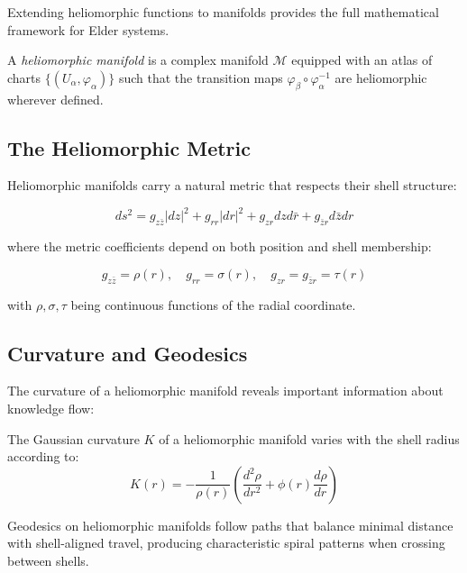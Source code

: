 Extending heliomorphic functions to manifolds provides the full mathematical framework for Elder systems.

\begin{definition}
A \textit{heliomorphic manifold} is a complex manifold $\mathcal{M}$ equipped with an atlas of charts $\{(U_{\alpha}, \varphi_{\alpha})\}$ such that the transition maps $\varphi_{\beta} \circ \varphi_{\alpha}^{-1}$ are heliomorphic wherever defined.
\end{definition}

\subsection{The Heliomorphic Metric}

Heliomorphic manifolds carry a natural metric that respects their shell structure:

\begin{equation}
ds^2 = g_{z\bar{z}}|dz|^2 + g_{rr}|dr|^2 + g_{z r}dz d\bar{r} + g_{\bar{z}r}d\bar{z}dr
\end{equation}

where the metric coefficients depend on both position and shell membership:

\begin{equation}
g_{z\bar{z}} = \rho(r), \quad g_{rr} = \sigma(r), \quad g_{z r} = g_{\bar{z}r} = \tau(r)
\end{equation}

with $\rho, \sigma, \tau$ being continuous functions of the radial coordinate.

\subsection{Curvature and Geodesics}

The curvature of a heliomorphic manifold reveals important information about knowledge flow:

\begin{proposition}
The Gaussian curvature $K$ of a heliomorphic manifold varies with the shell radius according to:
\begin{equation}
K(r) = -\frac{1}{\rho(r)}\left(\frac{d^2\rho}{dr^2} + \phi(r)\frac{d\rho}{dr}\right)
\end{equation}
\end{proposition}

Geodesics on heliomorphic manifolds follow paths that balance minimal distance with shell-aligned travel, producing characteristic spiral patterns when crossing between shells.

